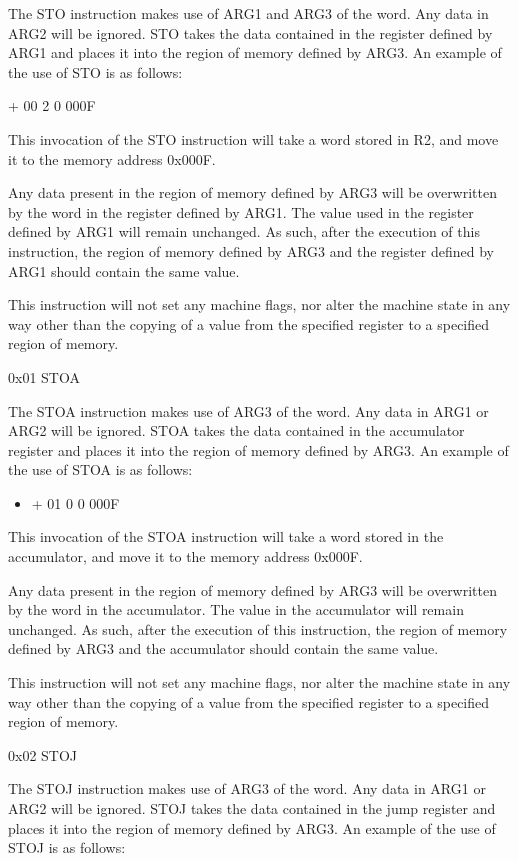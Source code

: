 \documentclass[]{article}
\providecommand{\tightlist}{%
  \setlength{\itemsep}{0pt}\setlength{\parskip}{0pt}}
\begin{document}
The STO instruction makes use of ARG1 and ARG3 of the word. Any data in
ARG2 will be ignored. STO takes the data contained in the register
defined by ARG1 and places it into the region of memory defined by ARG3.
An example of the use of STO is as follows:

+ 00 2 0 000F

This invocation of the STO instruction will take a word stored in R2,
and move it to the memory address 0x000F.

Any data present in the region of memory defined by ARG3 will be
overwritten by the word in the register defined by ARG1. The value used
in the register defined by ARG1 will remain unchanged. As such, after
the execution of this instruction, the region of memory defined by ARG3
and the register defined by ARG1 should contain the same value.~

This instruction will not set any machine flags, nor alter the machine
state in any way other than the copying of a value from the specified
register to a specified region of memory.

0x01 STOA

The STOA instruction makes use of ARG3 of the word. Any data in ARG1 or
ARG2 will be ignored. STOA takes the data contained in the accumulator
register and places it into the region of memory defined by ARG3. An
example of the use of STOA is as follows:

\begin{itemize}
\tightlist
\item
  + 01 0 0 000F
\end{itemize}

This invocation of the STOA instruction will take a word stored in the
accumulator, and move it to the memory address 0x000F.

Any data present in the region of memory defined by ARG3 will be
overwritten by the word in the accumulator. The value in the accumulator
will remain unchanged. As such, after the execution of this instruction,
the region of memory defined by ARG3 and the accumulator should contain
the same value.

This instruction will not set any machine flags, nor alter the machine
state in any way other than the copying of a value from the specified
register to a specified region of memory.

0x02 STOJ

The STOJ instruction makes use of ARG3 of the word. Any data in ARG1 or
ARG2 will be ignored. STOJ takes the data contained in the jump register
and places it into the region of memory defined by ARG3. An example of
the use of STOJ is as follows:
\end{document}
